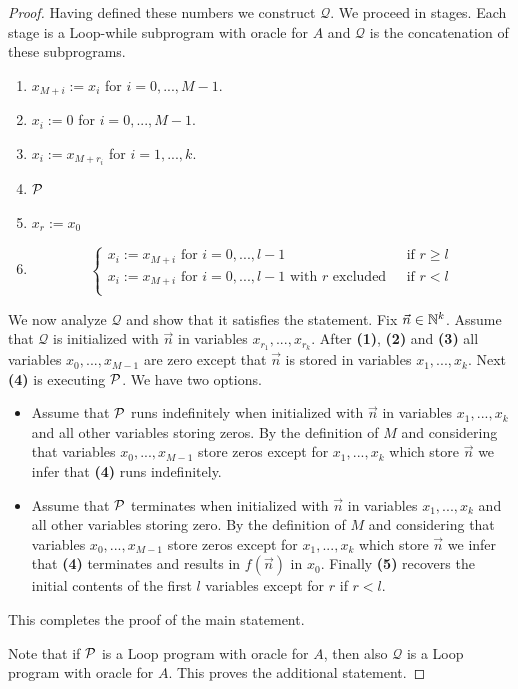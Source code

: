 \documentclass[10pt]{amsart}
\begin{document}
\begin{proof}
	Having defined these numbers we construct $\mathcal{Q}$. We proceed in stages. Each stage is a Loop-while subprogram with oracle for $A$ and $\mathcal{Q}$ is the concatenation of these subprograms.
	\begin{enumerate}[label=\textbf{(\arabic*)}, leftmargin=3.0em]
		\item $x_{M + i}:=x_i$ for $i=0,...,M-1$.
		\item $x_i:=0$ for $i=0,...,M-1$.
		\item $x_i:=x_{M+r_i}$ for $i=1,...,k$.
		\item ${\mathcal P}$
		\item $x_r:=x_0$
		\item $$\begin{cases}
				      x_i:=x_{M+i}\mbox{ for }i=0,...,l-1                                  & \mbox{ if }r \geq l \\
				      x_i:=x_{M + i}\mbox{ for }i=0,...,l-1\mbox{ with }r\mbox{ excluded } & \mbox{ if }r < l    \\
			      \end{cases}$$
	\end{enumerate}
	We now analyze $\mathcal{Q}$ and show that it satisfies the statement. Fix $\vec{n} \in {\mathbb N}^k$. Assume that $\mathcal{Q}$ is initialized with $\vec{n}$ in variables $x_{r_1},...,x_{r_k}$. After \textbf{(1)}, \textbf{(2)} and \textbf{(3)} all variables $x_0,...,x_{M - 1}$ are zero except that $\vec{n}$ is stored in variables $x_1,...,x_k$. Next \textbf{(4)} is executing ${\mathcal P}$. We have two options.
	\begin{itemize}
		\item Assume that ${\mathcal P}$ runs indefinitely when initialized with $\vec{n}$ in variables $x_1,...,x_k$ and all other variables storing zeros. By the definition of $M$ and considering that variables $x_0,...,x_{M-1}$ store zeros except for $x_1,...,x_k$ which store $\vec{n}$ we infer that \textbf{(4)} runs indefinitely.
		\item Assume that ${\mathcal P}$ terminates when initialized with $\vec{n}$ in variables $x_1,...,x_k$ and all other variables storing zero. By the definition of $M$ and considering that variables $x_0,...,x_{M-1}$ store zeros except for $x_1,...,x_k$ which store $\vec{n}$ we infer that \textbf{(4)} terminates and results in $f(\vec{n})$ in $x_0$. Finally \textbf{(5)} recovers the initial contents of the first $l$ variables except for $r$ if $r < l$.
	\end{itemize}
	This completes the proof of the main statement.

	Note that if ${\mathcal P}$ is a Loop program with oracle for $A$, then also $\mathcal{Q}$ is a Loop program with oracle for $A$. This proves the additional statement.
\end{proof}
\end{document}
